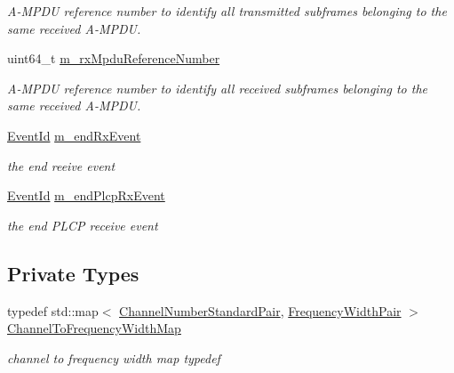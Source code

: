 \begin{DoxyCompactItemize}
\begin{DoxyCompactList}\small\item\em A-\/\+M\+P\+DU reference number to identify all transmitted subframes belonging to the same received A-\/\+M\+P\+DU. \end{DoxyCompactList}\item 
uint64\+\_\+t \hyperlink{classns3_1_1WifiPhy_ac4d2a0ac103e58c27743527d8289cc53}{m\+\_\+rx\+Mpdu\+Reference\+Number}
\begin{DoxyCompactList}\small\item\em A-\/\+M\+P\+DU reference number to identify all received subframes belonging to the same received A-\/\+M\+P\+DU. \end{DoxyCompactList}\item 
\hyperlink{classns3_1_1EventId}{Event\+Id} \hyperlink{classns3_1_1WifiPhy_a9a26087e4a13b0a4d82c412e801b139e}{m\+\_\+end\+Rx\+Event}
\begin{DoxyCompactList}\small\item\em the end reeive event \end{DoxyCompactList}\item 
\hyperlink{classns3_1_1EventId}{Event\+Id} \hyperlink{classns3_1_1WifiPhy_a82a8c191494752dc220bc3df57ea29cd}{m\+\_\+end\+Plcp\+Rx\+Event}
\begin{DoxyCompactList}\small\item\em the end P\+L\+CP receive event \end{DoxyCompactList}\end{DoxyCompactItemize}
\subsection*{Private Types}
\begin{DoxyCompactItemize}
\item 
typedef std\+::map$<$ \hyperlink{classns3_1_1WifiPhy_ad473141d47142c2df4a109bc559d6d50}{Channel\+Number\+Standard\+Pair}, \hyperlink{classns3_1_1WifiPhy_abb7b47ebed22c2703bcc239729d1e40c}{Frequency\+Width\+Pair} $>$ \hyperlink{classns3_1_1WifiPhy_a4d1dae8b6a2732b7c08343909a53ea3f}{Channel\+To\+Frequency\+Width\+Map}
\begin{DoxyCompactList}\small\item\em channel to frequency width map typedef \end{DoxyCompactList}\end{DoxyCompactItemize}

